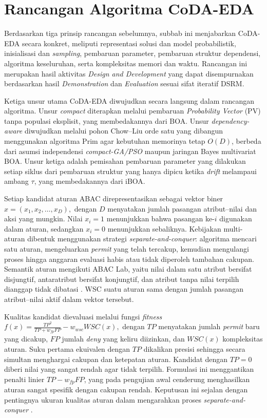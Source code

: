 \section{Rancangan Algoritma CoDA-EDA}

Berdasarkan tiga prinsip rancangan sebelumnya, subbab ini menjabarkan CoDA-EDA secara konkret, meliputi representasi solusi dan model probabilistik, inisialisasi dan \textit{sampling}, pembaruan parameter, pembaruan struktur dependensi, algoritma keseluruhan, serta kompleksitas memori dan waktu. 
Rancangan ini merupakan hasil aktivitas \textit{Design and Development} yang dapat disempurnakan berdasarkan hasil \textit{Demonstration} dan \textit{Evaluation} sesuai sifat iteratif DSRM.

Ketiga unsur utama CoDA-EDA diwujudkan secara langsung dalam rancangan algoritma. 
Unsur \textit{compact} diterapkan melalui pembaruan \textit{Probability Vector} (PV) tanpa populasi eksplisit, yang membedakannya dari BOA. 
Unsur \textit{dependency-aware} diwujudkan melalui pohon Chow–Liu orde satu yang dibangun menggunakan algoritma Prim agar kebutuhan memorinya tetap $O(D)$, berbeda dari asumsi independensi \textit{compact-GA/PSO} maupun jaringan Bayes multivariat BOA. 
Unsur ketiga adalah pemisahan pembaruan parameter yang dilakukan setiap siklus dari pembaruan struktur yang hanya dipicu ketika \textit{drift} melampaui ambang $\tau$, yang membedakannya dari iBOA.

Setiap kandidat aturan ABAC direpresentasikan sebagai vektor biner
$
x=(x_1,x_2,\ldots,x_D),
$\label{first:symbol-x}
dengan $D$ menyatakan jumlah pasangan atribut–nilai dan aksi yang mungkin. 
Nilai $x_i=1$ menunjukkan bahwa pasangan ke-$i$\label{first:symbol-i} digunakan dalam aturan, sedangkan $x_i=0$ menunjukkan sebaliknya. 
Kebijakan multi-aturan dibentuk menggunakan strategi \textit{separate-and-conquer}: algoritma mencari satu aturan, mengeluarkan \textit{permit} yang telah tercakup, kemudian mengulangi proses hingga anggaran evaluasi habis atau tidak diperoleh tambahan cakupan. 
Semantik aturan mengikuti ABAC Lab, yaitu nilai dalam satu atribut bersifat disjungtif, antaratribut bersifat konjungtif, dan atribut tanpa nilai terpilih dianggap tidak dibatasi \parencite{bui_abac_2025}. 
WSC suatu aturan sama dengan jumlah pasangan atribut–nilai aktif dalam vektor tersebut.

Kualitas kandidat dievaluasi melalui fungsi \textit{fitness}
$
f(x)=\frac{TP^2}{TP+w_{fp}FP}-w_{wsc}WSC(x),
$\label{first:symbol-fx}
dengan $TP$ menyatakan jumlah \textit{permit} baru yang dicakup, $FP$ jumlah \textit{deny} yang keliru diizinkan, dan $WSC(x)$ kompleksitas aturan. 
Suku pertama ekuivalen dengan $TP$ dikalikan presisi sehingga secara simultan menghargai cakupan dan ketepatan aturan. 
Kandidat dengan $TP=0$ diberi nilai yang sangat rendah agar tidak terpilih. 
Formulasi ini menggantikan penalti linier $TP-w_{fp}FP$, yang pada pengujian awal cenderung menghasilkan aturan sangat spesifik dengan cakupan rendah. 
Keputusan ini sejalan dengan pentingnya ukuran kualitas aturan dalam mengarahkan proses \textit{separate-and-conquer} \parencite{gudys_separate_2024}.

